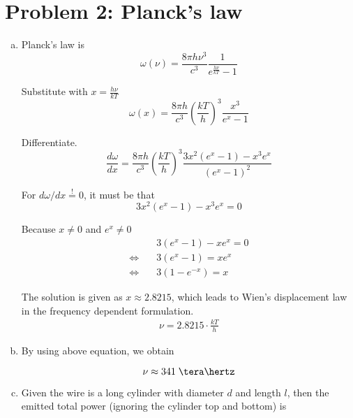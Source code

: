 \documentclass[a4paper,german,12pt,smallheadings]{scrartcl}
\begin{document}
\section*{Problem 2: Planck's law}
\begin{enumerate}[a)]
  \item
    Planck's law is
    \begin{equation*}
      \omega(\nu) = \frac{8 \pi h \nu^3}{c^3} \frac{1}{e^\frac{h \nu}{kT} - 1}
    \end{equation*}

    Substitute with $x = \frac{h \nu}{kT}$
    \begin{equation*}
      \omega(x) = \frac{8 \pi h}{c^3} \left(\frac{kT}{h}\right)^3 \frac{x^3}{e^x - 1}
    \end{equation*}

    Differentiate.
    \begin{equation*}
      \frac{d \omega}{dx} = \frac{8 \pi h}{c^3} \left(\frac{kT}{h}\right)^3 \frac{3x^2(e^x-1) - x^3e^x}{(e^x - 1)^2}
    \end{equation*}

    For $d \omega / dx \overset{!}{=} 0$, it must be that
    \begin{equation*}
      3x^2(e^x-1) - x^3e^x = 0
    \end{equation*}

    Because $x \neq 0$ and $e^x \neq 0$
    \begin{align*}
      &\quad 3(e^x-1) - xe^x = 0 \\
      \Leftrightarrow&\quad 3(e^x-1) = xe^x \\
      \Leftrightarrow&\quad 3(1 - e^{-x}) = x
    \end{align*}

    The solution is given as $x \approx 2.8215$, which leads to Wien's
    displacement law in the frequency dependent formulation.
    \begin{align*}
      \nu = 2.8215 \cdot \frac{kT}{h}
    \end{align*}

  \item
    By using above equation, we obtain

    \begin{equation*}
      \nu \approx 341 \; \tera\hertz
    \end{equation*}

  \item
    Given the wire is a long cylinder with diameter $d$ and length $l$, then
    the emitted total power (ignoring the cylinder top and bottom) is


\end{enumerate}
\end{document}
